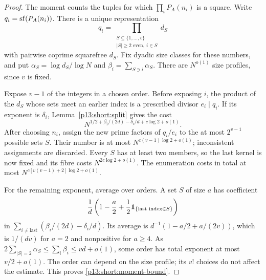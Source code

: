 \begin{proof}
The moment counts the tuples for which
\(\prod_iP_A(n_i)\) is a square. Write \(q_i=\sf(P_A(n_i))\).
There is a unique representation
\[
 q_i=\prod_{\substack{S\subseteq\{1,\ldots,v\}\\
                  |S|\ge2\text{ even},\ i\in S}}d_S
\]
with pairwise coprime squarefree \(d_S\). Fix dyadic size
classes for these numbers, and put
\(\alpha_S=\log d_S/\log N\) and
\(\beta_i=\sum_{S\ni i}\alpha_S\).
There are \(N^{o(1)}\) size profiles, since \(v\) is fixed.

Expose \(v-1\) of the integers in a chosen order. Before
exposing \(i\), the product of the \(d_S\) whose sets meet
an earlier index is a prescribed divisor \(e_i\mid q_i\).
If its exponent is \(\delta_i\), Lemma~\ref{p13:short:split}
gives the cost
\[
 N^{1/2+\beta_i/(2d)-\delta_i/d+c\log2+o(1)}.
\]
After choosing \(n_i\), assign the new prime factors of
\(q_i/e_i\) to the at most \(2^{v-1}\) possible sets \(S\).
Their number is at most
\(N^{c(v-1)\log2+o(1)}\); inconsistent assignments are
discarded. Every \(S\) has at least two members, so the last
kernel is now fixed and its fibre costs
\(N^{2c\log2+o(1)}\). The enumeration costs in total at most
\(N^{c[v(v-1)+2]\log2+o(1)}\).

For the remaining exponent, average over orders. A set \(S\)
of size \(a\) has coefficient
\[
 \frac1d\left(1-\frac a2+
               \frac12\ind_{\{\text{last index}\in S\}}\right)
\]
in \(\sum_{i\ne\mathrm{last}}(\beta_i/(2d)-\delta_i/d)\).
Its average is \(d^{-1}(1-a/2+a/(2v))\), which is
\(1/(dv)\) for \(a=2\) and nonpositive for \(a\ge4\).
As \(2\sum_{|S|=2}\alpha_S\le\sum_i\beta_i\le vd+o(1)\),
some order has total exponent at most \(v/2+o(1)\).
The order can depend on the size profile; its \(v!\) choices
do not affect the estimate. This proves
\eqref{p13:short:moment-bound}.
\end{proof}
